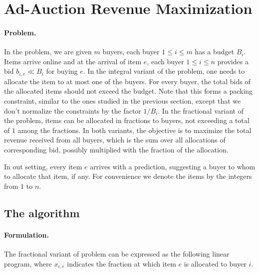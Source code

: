 
\section{Ad-Auction Revenue Maximization}		\label{sec:ad-auction}

\paragraph{Problem.} In the problem, we are given $m$ buyers, each buyer $1 \leq i \leq m$ has a budget $B_{i}$.  
Items arrive online and at the arrival of item $e$, 
each buyer $1 \leq i \leq n$ provides a bid $b_{i,e} \ll B_{i}$ for buying $e$.
In the integral variant of the problem, one needs to allocate the item to at most one of the buyers. For every buyer, the total bids of the allocated items should not exceed the budget. Note that this forms a packing constraint, similar to the ones studied in the previous section, except that we don't normalize the constraints by the factor $1/B_i$.
In the fractional variant of the problem, items can be allocated in fractions to buyers, not exceeding a total of $1$ among the fractions.  In both variants, the objective is to maximize the total revenue received from all buyers, which is the sum over all  allocations of corresponding bid, possibly multiplied with the fraction of the allocation.

In out setting, every item $e$ arrives with a prediction, suggesting a buyer to whom to allocate that item, if any.
For convenience we denote the items by the integers from $1$ to $n$.

\subsection{The algorithm}

\paragraph{Formulation.}
The fractional variant of problem can be expressed as the following linear program, where $x_{i,e}$ indicates the fraction at which item $e$ is allocated to buyer $i$.


